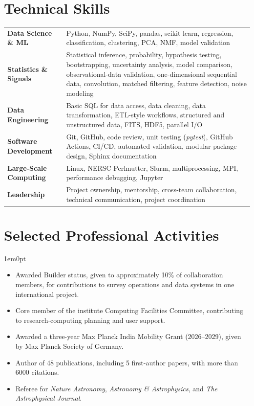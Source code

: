 \documentclass[a4paper,10pt]{article}
\begin{document}
\vspace*{-2mm}

\section*{Technical Skills}
\renewcommand{\arraystretch}{1.1}
\begin{tabular}{p{3.4cm} p{12.5cm}}
    \textbf{Data Science \& ML} & Python, NumPy, SciPy, pandas, scikit-learn, regression, classification, clustering, PCA, NMF, model validation \\
    \textbf{Statistics \& Signals} & Statistical inference, probability, hypothesis testing, bootstrapping, uncertainty analysis, model comparison, observational-data validation, one-dimensional sequential data, convolution, matched filtering, feature detection, noise modeling \\
    \textbf{Data Engineering} & Basic SQL for data access, data cleaning, data transformation, ETL-style workflows, structured and unstructured data, FITS, HDF5, parallel I/O \\
    \textbf{Software Development} & Git, GitHub, code review, unit testing (\textit{pytest}), GitHub Actions, CI/CD, automated validation, modular package design, Sphinx documentation \\
    \textbf{Large-Scale Computing} & Linux, NERSC Perlmutter, Slurm, multiprocessing, MPI, performance debugging, Jupyter \\
    \textbf{Leadership} & Project ownership, mentorship, cross-team collaboration, technical communication, project coordination
\end{tabular}
\renewcommand{\arraystretch}{1.0}

\vspace*{-2mm}

\section*{Selected Professional Activities}
\begin{adjustwidth}{1em}{0pt}
\begin{itemize}[leftmargin=*, itemsep=2pt]
    \item Awarded Builder status, given to approximately 10\% of collaboration members, for contributions to survey operations and data systems in one international project.
    \item Core member of the institute Computing Facilities Committee, contributing to research-computing planning and user support.
    \item Awarded a three-year Max Planck India Mobility Grant (2026--2029), given by Max Planck Society of Germany.
    \item Author of 48 publications, including 5 first-author papers, with more than 6000 citations.
    \item Referee for \textit{Nature Astronomy}, \textit{Astronomy \& Astrophysics}, and \textit{The Astrophysical Journal}.
\end{itemize}
\end{adjustwidth}
\end{document}

